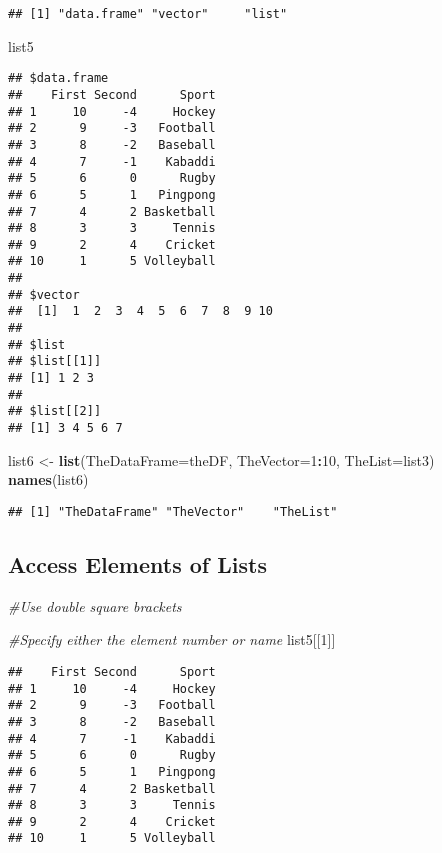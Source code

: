 \documentclass[
]{article}
\newenvironment{Shaded}{\begin{snugshade}}{\end{snugshade}}
\newcommand{\AttributeTok}[1]{\textcolor[rgb]{0.13,0.29,0.53}{#1}}
\newcommand{\CommentTok}[1]{\textcolor[rgb]{0.56,0.35,0.01}{\textit{#1}}}
\newcommand{\DecValTok}[1]{\textcolor[rgb]{0.00,0.00,0.81}{#1}}
\newcommand{\FunctionTok}[1]{\textcolor[rgb]{0.13,0.29,0.53}{\textbf{#1}}}
\newcommand{\NormalTok}[1]{#1}
\newcommand{\OtherTok}[1]{\textcolor[rgb]{0.56,0.35,0.01}{#1}}
\newcommand{\SpecialCharTok}[1]{\textcolor[rgb]{0.81,0.36,0.00}{\textbf{#1}}}
\begin{document}
\begin{verbatim}
## [1] "data.frame" "vector"     "list"
\end{verbatim}

\begin{Shaded}
\begin{Highlighting}[]
\NormalTok{list5}
\end{Highlighting}
\end{Shaded}

\begin{verbatim}
## $data.frame
##    First Second      Sport
## 1     10     -4     Hockey
## 2      9     -3   Football
## 3      8     -2   Baseball
## 4      7     -1    Kabaddi
## 5      6      0      Rugby
## 6      5      1   Pingpong
## 7      4      2 Basketball
## 8      3      3     Tennis
## 9      2      4    Cricket
## 10     1      5 Volleyball
## 
## $vector
##  [1]  1  2  3  4  5  6  7  8  9 10
## 
## $list
## $list[[1]]
## [1] 1 2 3
## 
## $list[[2]]
## [1] 3 4 5 6 7
\end{verbatim}

\begin{Shaded}
\begin{Highlighting}[]
\NormalTok{list6 }\OtherTok{\textless{}{-}} \FunctionTok{list}\NormalTok{(}\AttributeTok{TheDataFrame=}\NormalTok{theDF,}
\AttributeTok{TheVector=}\DecValTok{1}\SpecialCharTok{:}\DecValTok{10}\NormalTok{, }\AttributeTok{TheList=}\NormalTok{list3)}
\FunctionTok{names}\NormalTok{(list6)}
\end{Highlighting}
\end{Shaded}

\begin{verbatim}
## [1] "TheDataFrame" "TheVector"    "TheList"
\end{verbatim}

\subsection{Access Elements of Lists}\label{access-elements-of-lists}

\begin{Shaded}
\begin{Highlighting}[]
\CommentTok{\#Use double square brackets}

\CommentTok{\#Specify either the element number or name}
\NormalTok{list5[[}\DecValTok{1}\NormalTok{]]}
\end{Highlighting}
\end{Shaded}

\begin{verbatim}
##    First Second      Sport
## 1     10     -4     Hockey
## 2      9     -3   Football
## 3      8     -2   Baseball
## 4      7     -1    Kabaddi
## 5      6      0      Rugby
## 6      5      1   Pingpong
## 7      4      2 Basketball
## 8      3      3     Tennis
## 9      2      4    Cricket
## 10     1      5 Volleyball
\end{verbatim}
\end{document}

